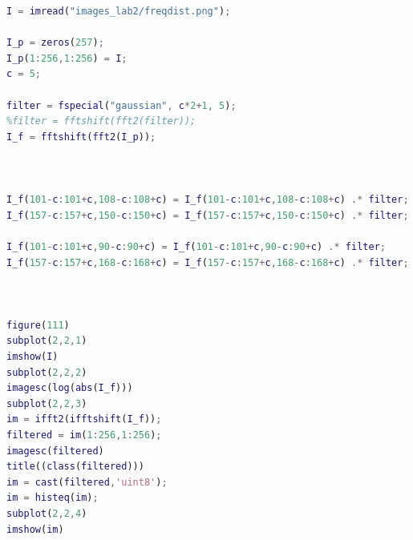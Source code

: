 \documentclass[oneside,a4paper]{article}
\begin{document}
\begin{lstlisting}[language=MATLAB]
I = imread("images_lab2/freqdist.png");

I_p = zeros(257);
I_p(1:256,1:256) = I;
c = 5;

filter = fspecial("gaussian", c*2+1, 5); 
%filter = fftshift(fft2(filter));
I_f = fftshift(fft2(I_p));


 
I_f(101-c:101+c,108-c:108+c) = I_f(101-c:101+c,108-c:108+c) .* filter;
I_f(157-c:157+c,150-c:150+c) = I_f(157-c:157+c,150-c:150+c) .* filter;

I_f(101-c:101+c,90-c:90+c) = I_f(101-c:101+c,90-c:90+c) .* filter;
I_f(157-c:157+c,168-c:168+c) = I_f(157-c:157+c,168-c:168+c) .* filter;



figure(111)
subplot(2,2,1)
imshow(I)
subplot(2,2,2)
imagesc(log(abs(I_f)))
subplot(2,2,3)
im = ifft2(ifftshift(I_f));
filtered = im(1:256,1:256);
imagesc(filtered)
title((class(filtered)))
im = cast(filtered,'uint8');
im = histeq(im);
subplot(2,2,4)
imshow(im)

\end{lstlisting}



%
%
%
\end{document}
